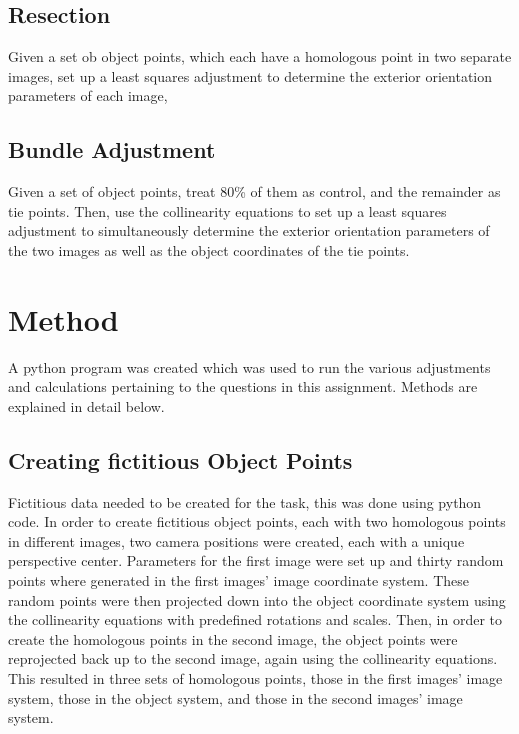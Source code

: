 \documentclass{article}
\begin{document}
\subsection{Resection}
Given a set ob object points, which each have a homologous point in two separate images, set up a least squares adjustment
to determine the exterior orientation parameters of each image,

\subsection{Bundle Adjustment}
Given a set of object points, treat 80\% of them as control, and the remainder as tie points.
Then, use the collinearity equations to set up a least squares adjustment to simultaneously determine the exterior
orientation parameters of the two images as well as the object coordinates of the tie points.

\newpage

\section{Method}
A python program was created which was used to run the various adjustments and calculations pertaining to the questions
in this assignment. Methods are explained in detail below.

\subsection{Creating fictitious Object Points}
Fictitious data needed to be created for the task, this was done using python code.
In order to create fictitious object points, each with two homologous points in different images,
two camera positions were created, each with a unique perspective center.
Parameters for the first image were set up and thirty random points where generated in the first images' image coordinate system.
These random points were then projected down into the object coordinate system using the collinearity equations with
predefined rotations and scales. Then, in order to create the homologous points in the second image, the object points were
reprojected back up to the second image, again using the collinearity equations.
This resulted in three sets of homologous points, those in the first images' image system, those in the object system,
and those in the second images' image system.
\end{document}

